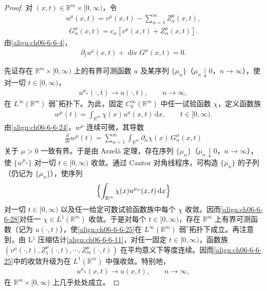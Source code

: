 \documentclass[../../main.tex]{subfiles}
\begin{document}
\begin{proof}
对 $(x,t)\in\mathbb{R}^{m}\times[0,\infty)$，令
\begin{align}
u^{\mu}(x,t)=v^{\mu}(x,t)-\sum_{\alpha=1}^{m}Z_{\alpha}^{\mu}(x,t),
\label{align:ch06-6-6-22}
\end{align}
\begin{align}
G_{\alpha}^{\mu}(x,t)=c_{\alpha}[v^{\mu}(x,t)+Z_{\alpha}^{\mu}(x,t)].
\label{align:ch06-6-6-23}
\end{align}
由\eqref{align:ch06-6-6-4}，
\begin{align}
\partial_{t}u^{\mu}(x,t)+\operatorname{div}G^{\mu}(x,t)=0.
\label{align:ch06-6-6-24}
\end{align}

先证存在 $\mathbb{R}^{m}\times[0,\infty)$ 上的有界可测函数 $u$ 及某序列 $\{\mu_{n}\}$（$\mu_{n}\downarrow 0$，$n\to\infty$），使对一切 $t\in[0,\infty)$，
\begin{align}
u^{\mu_{n}}(\cdot,t)\longrightarrow u(\cdot,t),\qquad n\to\infty,
\label{align:ch06-6-6-25}
\end{align}
在 $L^{\infty}(\mathbb{R}^{m})$ 弱$^{*}$拓扑下。为此，固定 $C_{0}^{\infty}(\mathbb{R}^{m})$ 中任一试验函数 $\chi$，定义函数族
\begin{align}
w^{\mu}(t)=\int_{\mathbb{R}^{m}}\chi(x)u^{\mu}(x,t)\,\mathrm{d}x,\qquad t\in[0,\infty).
\label{align:ch06-6-6-26}
\end{align}
由\eqref{align:ch06-6-6-24}，$w^{\mu}$ 连续可微，其导数
\begin{align}
\frac{\mathrm{d}}{\mathrm{d}t}w^{\mu}(t)=\sum_{\alpha=1}^{m}\int_{\mathbb{R}^{m}}\partial_{\alpha}\chi(x)\,G_{\alpha}^{\mu}(x,t)
\label{align:ch06-6-6-27}
\end{align}
关于 $\mu>0$ 一致有界。于是由 Arzelà 定理，存在序列 $\{\mu_{n}\}$（$\mu_{n}\downarrow 0$，$n\to\infty$），使 $\{w^{\mu_{n}}\}$ 对一切 $t\in[0,\infty)$ 收敛。通过 Cantor 对角线程序，可构造 $\{\mu_{n}\}$ 的子列（仍记为 $\{\mu_{n}\}$），使序列
\begin{align}
\Bigl{\{}\int_{\mathbb{R}^{m}}\chi(x)u^{\mu_{n}}(x,t)\,\mathrm{d}x\Bigr{\}}
\label{align:ch06-6-6-28}
\end{align}
对一切 $t\in[0,\infty)$ 以及任一给定可数试验函数族中每个 $\chi$ 收敛。因而\eqref{align:ch06-6-6-28}对任一 $\chi\in L^{1}(\mathbb{R}^{m})$ 收敛。于是对每个 $t\in[0,\infty)$，存在 $\mathbb{R}^{m}$ 上有界可测函数（记为 $u(\cdot,t)$），使\eqref{align:ch06-6-6-25}在 $L^{\infty}(\mathbb{R}^{m})$ 弱$^{*}$拓扑下成立。再注意到，由 L$^{1}$ 压缩估计\eqref{align:ch06-6-6-11}，对任一固定 $t\in[0,\infty)$，函数族 $(v^{\mu}(\cdot,t),Z_{1}^{\mu}(\cdot,t),\cdots,Z_{m}^{\mu}(\cdot,t))$ 在平均意义下等度连续。因而\eqref{align:ch06-6-6-25}中的收敛升级为在 $L^{1}(\mathbb{R}^{m})$ 中强收敛。特别地，
\begin{align}
u^{\mu_{n}}(x,t)\longrightarrow u(x,t),\qquad n\to\infty,
\label{align:ch06-6-6-29}
\end{align}
在 $\mathbb{R}^{m}\times[0,\infty)$ 上几乎处处成立。


\end{proof}
\end{document}
